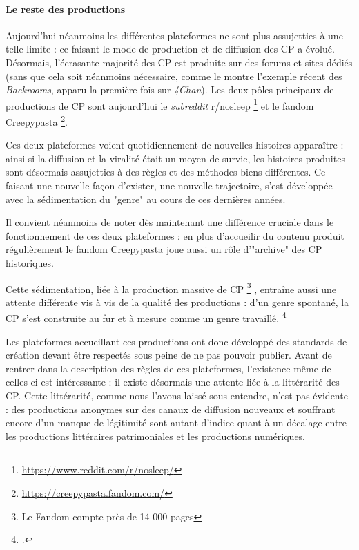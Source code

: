 \documentclass[12pt,a4paper,oneside,titlepage]{article} %
\begin{document}
	\paragraph*{Le reste des productions}
	
	Aujourd’hui néanmoins les différentes plateformes ne sont plus assujetties à une telle limite : ce faisant le mode de production et de diffusion des CP a évolué.
	Désormais, l’écrasante majorité des CP est produite sur des forums et sites dédiés (sans que cela soit néanmoins nécessaire, comme le montre l'exemple récent des \emph{Backrooms}, apparu la première fois sur \emph{4Chan}). Les deux pôles principaux de productions de CP sont aujourd'hui le \emph{subreddit} r/nosleep \footnote{\url{https://www.reddit.com/r/nosleep/}} et le fandom Creepypasta \footnote{\url{https://creepypasta.fandom.com/}}. 
	
	Ces deux plateformes voient  quotidiennement de nouvelles histoires apparaître : ainsi si la diffusion et la viralité était un moyen de survie, les histoires produites sont désormais assujetties à des règles et des méthodes biens différentes. Ce faisant une nouvelle façon d'exister, une nouvelle trajectoire, s'est développée avec la sédimentation du "genre" au cours de ces dernières années. 
	
	Il convient néanmoins de noter dès maintenant une différence cruciale dans le fonctionnement de ces deux plateformes : en plus d'accueilir du contenu produit régulièrement le fandom Creepypasta joue aussi un rôle d'"archive" des CP historiques. 
	
	Cette sédimentation, liée à la production massive de CP \footnote{Le Fandom compte près de 14 000 pages} , entraîne aussi une attente différente vis à vis de la qualité des productions : d'un genre spontané, la CP s'est construite au fur et à mesure comme un genre travaillé. \footcite{garcia_roca_creepypasta_2021}
	

	Les plateformes accueillant ces productions ont donc développé des standards de création devant être respectés sous peine de ne pas pouvoir publier. 
	Avant de rentrer dans la description des règles de ces plateformes, l'existence même de celles-ci est intéressante : il existe désormais une attente liée à la littérarité des CP. Cette littérarité, comme nous l'avons laissé sous-entendre, n'est pas évidente : des productions anonymes sur des canaux de diffusion nouveaux et souffrant encore d'un manque de légitimité sont autant d'indice quant à un décalage entre les productions littéraires patrimoniales et les productions numériques.
	
\end{document}
